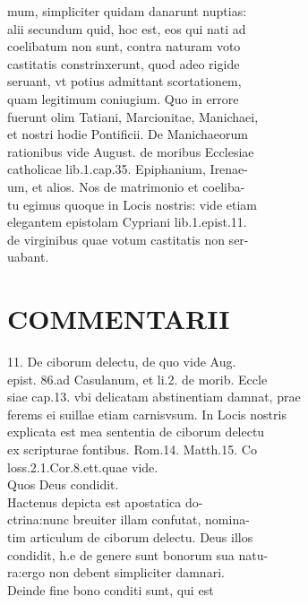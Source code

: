 \documentclass{article}
\begin{document}
\begin{pages}
mum, simpliciter quidam danarunt nuptias: \\
                alii secundum quid, hoc est, eos qui nati ad \\
                coelibatum non sunt, contra naturam voto \\
                castitatis constrinxerunt, quod adeo rigide \\
                seruant, vt potius admittant scortationem, \\
                quam legitimum coniugium. Quo in errore \\
                fuerunt olim Tatiani, Marcionitae, Manichaei, \\
                et nostri hodie Pontificii. De Manichaeorum \\
                rationibus vide August. de moribus Ecclesiae \\
                catholicae lib.1.cap.35. Epiphanium, Irenae- \\
                um, et alios. Nos de matrimonio et coeliba- \\
                tu egimus quoque in Locis nostris: vide etiam \\
                elegantem epistolam Cypriani lib.1.epist.11. \\
                de virginibus quae votum castitatis non ser- \\
                uabant. \\
                
\section*{COMMENTARII \\
                }11. De ciborum delectu, de quo vide Aug. \\
                epist. 86.ad Casulanum, et li.2. de morib. Eccle \\
                siae cap.13. vbi delicatam abstinentiam damnat, prae \\
                ferems ei suillae etiam carnisvsum. In Locis nostris \\
                explicata est mea sententia de ciborum delectu \\
                ex scripturae fontibus. Rom.14. Matth.15. Co \\
                loss.2.1.Cor.8.ett.quae vide. \\
                Quos Deus condidit. \\
                Hactenus depicta est apostatica do- \\
                ctrina:nunc breuiter illam confutat, nomina- \\
                tim articulum de ciborum delectu. Deus illos \\
                condidit, h.e de genere sunt bonorum sua natu- \\
                ra:ergo non debent simpliciter damnari. \\
                Deinde fine bono conditi sunt, qui est \\
                

\end{pages}
\end{document}
